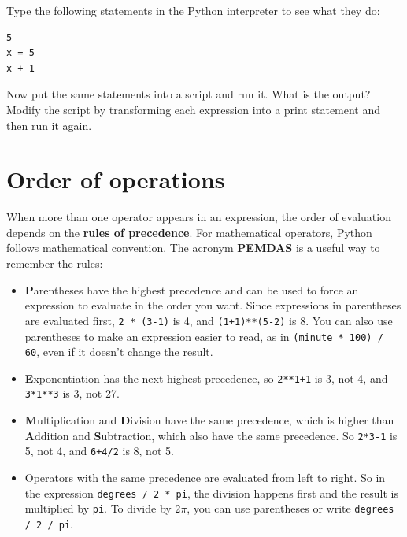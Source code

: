 \begin{exercise}
Type the following statements in the Python interpreter to see
what they do:

\beforeverb
\begin{verbatim}
5
x = 5
x + 1
\end{verbatim}
\afterverb
%
Now put the same statements into a script and run it.  What
is the output?  Modify the script by transforming each
expression into a print statement and then run it again.
\end{exercise}


\section{Order of operations}

When more than one operator appears in an expression, the order of
evaluation depends on the {\bf rules of precedence}.  For
mathematical operators, Python follows mathematical convention.
The acronym {\bf PEMDAS} is a useful way to
remember the rules:


\begin{itemize}

\item {\bf P}arentheses have the highest precedence and can be used 
to force an expression to evaluate in the order you want. Since
expressions in parentheses are evaluated first, {\tt 2 * (3-1)} is 4,
and {\tt (1+1)**(5-2)} is 8. You can also use parentheses to make an
expression easier to read, as in {\tt (minute * 100) / 60}, even
if it doesn't change the result.

\item {\bf E}xponentiation has the next highest precedence, so
{\tt 2**1+1} is 3, not 4, and {\tt 3*1**3} is 3, not 27.

\item {\bf M}ultiplication and {\bf D}ivision have the same precedence,
which is higher than {\bf A}ddition and {\bf S}ubtraction, which also
have the same precedence.  So {\tt 2*3-1} is 5, not 4, and
{\tt 6+4/2} is 8, not 5.

\item Operators with the same precedence are evaluated from left to 
right.  So in the expression {\tt degrees / 2 * pi}, the division
happens first and the result is multiplied by {\tt pi}.  
To divide by $2 \pi$, you can use parentheses or write {\tt degrees / 2 / pi}.

\end{itemize}

